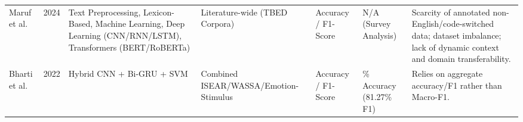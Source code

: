 \documentclass[conference]{IEEEtran}
\begin{document}
\begin{table}[t]
\begin{tabularx}{\textwidth}{@{} >{\hsize=0.85\hsize}X c >{\hsize=1.05\hsize}X >{\hsize=1.0\hsize}X >{\hsize=0.85\hsize}X >{\hsize=1.05\hsize}X >{\hsize=1.2\hsize}X @{}}
Maruf et al. \cite{maruf2024challenges} & 2024 & Text Preprocessing, Lexicon-Based, Machine Learning, Deep Learning (CNN/RNN/LSTM), Transformers (BERT/RoBERTa) & Literature-wide (TBED Corpora) & Accuracy / F1-Score & N/A (Survey Analysis) & Scarcity of annotated non-English/code-switched data; dataset imbalance; lack of dynamic context and domain transferability. \\
\addlinespace

Bharti et al. \cite{bharti_2022_computational} & 2022 & Hybrid CNN + Bi-GRU + SVM & Combined ISEAR/WASSA/Emotion-Stimulus & Accuracy / F1-Score & 80.11\% Accuracy (81.27\% F1) & Relies on aggregate accuracy/F1 rather than Macro-F1. \\

\bottomrule
\end{tabularx}
\end{table}
\end{document}
